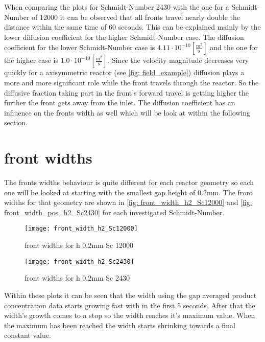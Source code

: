 \documentclass[../thesis.tex]{subfiles}
\begin{document}
When comparing the plots for Schmidt-Number 2430 with the one for a Schmidt-Number of 12000 it can be observed that all fronts travel nearly double the distance within the same time of 60 seconds. This can be explained mainly by the lower diffusion coefficient for the higher Schmidt-Number case. The diffusion coefficient for the lower Schmidt-Number case is $4 \text{.}11 \cdot 10^{-10} \left[ \frac{\mathrm{m^2}}{\mathrm{s}} \right]$ and the one for the higher case is $1\text{.}0 \cdot 10^{-10} \left[ \frac{\mathrm{m^2}}{\mathrm{s}} \right]$.
Since the velocity magnitude decreases very quickly for a axisymmetric reactor (see \autoref{fig: field_example}) diffusion plays a more and more significant role while the front travels through the reactor. So the diffusive fraction taking part in the front's forward travel is getting higher the further the front gets away from the inlet. The diffusion coefficient has an influence on the fronts width as well which will be look at within the following section.

\section{front widths}

The fronts widths behaviour is quite different for each reactor geometry so each one will be looked at starting with the smallest gap height of 0.2mm. The front widths for that geometry are shown in \autoref{fig: front_width_h2_Sc12000} and \autoref{fig: front_width_pos_h2_Sc2430} for each investigated Schmidt-Number.

\begin{figure}[htbp]
	\centering
	\texttt{[image: front\_width\_h2\_Sc12000]}
	\caption{front widths for h 0.2mm Sc 12000\label{fig: front_width_h2_Sc12000}}\bigskip
	\texttt{[image: front\_width\_h2\_Sc2430]}
	\caption{front widths for h 0.2mm Sc 2430\label{fig: front_width_pos_h2_Sc2430}}
\end{figure}

Within these plots it can be seen that the width using the gap averaged product concentration data starts growing fast with in the first 5 seconds. After that the width's growth comes to a stop so the width reaches it's maximum value. When the maximum has been reached the width starts shrinking towards a final constant value.
\end{document}
